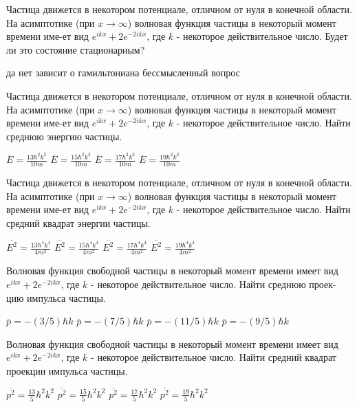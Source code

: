 \documentclass[11pt,a4paper]{exam}
\begin{document}
\begin{questions}
\question Частица движется в некотором потенциале, отличном от нуля в конечной области. На асимптотике (при $x \to \infty $) волновая функция частицы в некоторый момент времени име-ет вид ${e^{ikx}} + 2{e^{ - 2ikx}}$, где $k$ - некоторое действительное число. Будет ли это состояние стационарным?
\begin{choices}
\choice да    
\choice нет      
\choice зависит о гамильтониана    
\choice бессмысленный вопрос
\end{choices}

\question Частица движется в некотором потенциале, отличном от нуля в конечной области. На асимптотике (при $x \to \infty $) волновая функция частицы в некоторый момент времени име-ет вид ${e^{ikx}} + 2{e^{ - 2ikx}}$, где $k$ - некоторое действительное число. Найти среднюю энергию частицы.
\begin{choices}
\choice $\overline E  = \frac{{13{\hbar ^2}{k^2}}}{{10m}}$ 
\choice $\overline E  = \frac{{15{\hbar ^2}{k^2}}}{{10m}}$    
\choice $\overline E  = \frac{{17{\hbar ^2}{k^2}}}{{10m}}$    
\choice $\overline E  = \frac{{19{\hbar ^2}{k^2}}}{{10m}}$
\end{choices}

\question Частица движется в некотором потенциале, отличном от нуля в конечной области. На асимптотике (при $x \to \infty $) волновая функция частицы в некоторый момент времени име-ет вид ${e^{ikx}} + 2{e^{ - 2ikx}}$, где $k$ - некоторое действительное число. Найти средний квадрат энергии частицы.
\begin{choices}
\choice $\overline {{E^2}}  = \frac{{13{\hbar ^4}{k^4}}}{{4{m^2}}}$ 
\choice $\overline {{E^2}}  = \frac{{15{\hbar ^4}{k^4}}}{{4{m^2}}}$    
\choice $\overline {{E^2}}  = \frac{{17{\hbar ^4}{k^4}}}{{4{m^2}}}$    
\choice $\overline {{E^2}}  = \frac{{19{\hbar ^4}{k^4}}}{{4{m^2}}}$
\end{choices}

\question Волновая функция свободной частицы в некоторый момент времени имеет вид ${e^{ikx}} + 2{e^{ - 2ikx}}$, где $k$ - некоторое действительное число. Найти среднюю проек-цию импульса частицы.
\begin{choices}
\choice $\overline p  =  - (3/5)\hbar k$ 
\choice $\overline p  =  - (7/5)\hbar k$    
\choice $\overline p  =  - (11/5)\hbar k$      
\choice $\overline p  =  - (9/5)\hbar k$
\end{choices}

\question Волновая функция свободной частицы в некоторый момент времени имеет вид ${e^{ikx}} + 2{e^{ - 2ikx}}$, где $k$ - некоторое действительное число. Найти средний квадрат проекции импульса частицы.
\begin{choices}
\choice $\overline {{p^2}}  = \frac{{13}}{5}{\hbar ^2}{k^2}$  
\choice $\overline {{p^2}}  = \frac{{15}}{5}{\hbar ^2}{k^2}$     
\choice $\overline {{p^2}}  = \frac{{17}}{5}{\hbar ^2}{k^2}$     
\choice $\overline {{p^2}}  = \frac{{19}}{5}{\hbar ^2}{k^2}$
\end{choices}


\end{questions}
\end{document}
